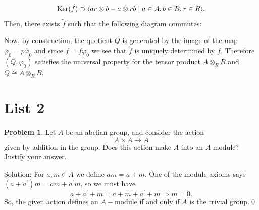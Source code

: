 \begin{equation}
    \text{Ker}(\hat{f})\supset \langle ar\otimes b - a\otimes rb\mid a\in A,b\in B,r\in R\rangle.
\end{equation}
Then, there exists $\tilde{f}$ such that the following diagram commutes:\begin{center}
\end{center}
Now, by construction, the quotient $Q$ is generated by the image of the map 
$\varphi_0 = p\hat{\varphi}_0$ and since $f = \tilde{f}\varphi_0$ we see that $\tilde{f}$ is uniquely determined 
by $f$. Therefore $(Q,\varphi_0)$ satisfies the universal property for the tensor product $A\otimes_RB$ and 
$Q\cong A\otimes_RB$.






\section{List 2}
\begin{dang}
\textbf{Problem 1}.
Let $A$ be an abelian group, and consider the action
\[
A \times A \longrightarrow A
\]
given by addition in the group. Does this action make $A$ into an
$A$-module? Justify your answer.
\end{dang}
Solution: For $a,m\in A$ we define $am = a+m$. One of the module axioms says 
$(a+a^\prime)m = am + a^\prime m$, so we must have 
\begin{equation}
    a+a^\prime + m = a+m + a^\prime + m\Rightarrow m=0.
\end{equation}
So, the given action defines an $A-$module if and only if $A$ is the trivial group.\qed 


